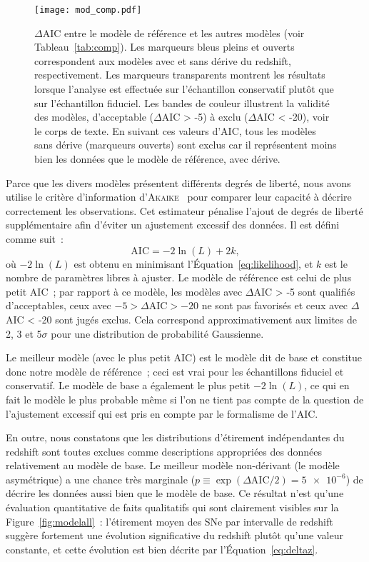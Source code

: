 \documentclass[../main/main.tex]{subfiles}
\begin{document}
\begin{figure}[ht]
    \centering
    \texttt{[image: mod\_comp.pdf]}
    \caption[$\Delta$AIC entre le modèle de base et les autres
    modèles]{$\Delta$AIC entre le modèle de référence et les autres
        modèles (voir Tableau~\ref{tab:comp}). Les marqueurs bleus pleins et
        ouverts correspondent aux modèles avec et sans dérive du redshift,
        respectivement. Les marqueurs transparents montrent les résultats
        lorsque l'analyse est effectuée sur l'échantillon conservatif plutôt que
        sur l'échantillon fiduciel. Les bandes de couleur illustrent la validité
        des modèles, d'acceptable ($\Delta$AIC > -5) à exclu ($\Delta$AIC <
        -20), voir le corps de texte. En suivant ces valeurs d'AIC, tous les
        modèles sans dérive (marqueurs ouverts) sont exclus car il représentent
    moins bien les données que le modèle de référence, avec dérive.}
    \label{fig:mod_comp}
\end{figure}

Parce que les divers modèles présentent différents degrés de liberté, nous avons
utilise le critère d'information d'\textsc{Akaike}~\citep[AIC, voir par
exemple][]{burnham2004} pour comparer leur capacité à décrire correctement les
observations. Cet estimateur pénalise l'ajout de degrés de liberté
supplémentaire afin d'éviter un ajustement excessif des données. Il est défini
comme suit~:
\begin{equation}\label{eq:aic}
    \mathrm{AIC} = -2\ln(L) + 2k,
\end{equation}
où $-2\ln(L)$ est obtenu en minimisant l'Équation~\ref{eq:likelihood}, et $k$
est le nombre de paramètres libres à ajuster. Le modèle de référence est celui
de plus petit AIC~; par rapport à ce modèle, les modèles avec $\Delta$AIC > -5
sont qualifiés d'acceptables, ceux avec $-5 > \Delta\mathrm{AIC} > -20$ ne sont
pas favorisés et ceux avec $\Delta$AIC < -20 sont jugés exclus. Cela correspond
approximativement aux limites de 2, 3 et 5$\sigma$ pour une distribution de
probabilité Gaussienne.

Le meilleur modèle (avec le plus petit AIC) est le modèle dit de base et
constitue donc notre modèle de référence~; ceci est vrai pour les échantillons
fiduciel et conservatif. Le modèle de base a également le plus petit $-2\ln(L)$,
ce qui en fait le modèle le plus probable même si l'on ne tient pas compte de la
question de l'ajustement excessif qui est pris en compte par le formalisme de
l'AIC.

En outre, nous constatons que les distributions d'étirement indépendantes du
redshift sont toutes exclues comme descriptions appropriées des données
relativement au modèle de base. Le meilleur modèle  non-dérivant (le modèle
asymétrique) a une chance très marginale ($p \equiv \exp(\Delta\mathrm{AIC}/2) =
\num{5e-6}$) de décrire les données aussi bien que le modèle de base. Ce
résultat n'est qu'une évaluation quantitative de faits qualitatifs qui sont
clairement visibles sur la Figure~\ref{fig:modelall}~: l'étirement moyen des SNe
par intervalle de redshift suggère fortement une évolution significative du
redshift plutôt qu'une valeur constante, et cette évolution est bien décrite par
l'Équation~\ref{eq:deltaz}.
\end{document}
